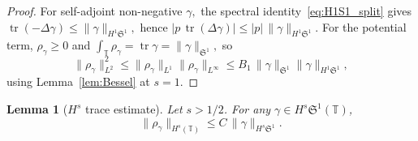 \documentclass[11pt]{amsart}
\newtheorem{lemma}[theorem]{Lemma}
\theoremstyle{definition}
\newcommand{\T}{\mathbb{T}}
\newcommand{\Sp}{\mathfrak{S}}
\DeclareMathOperator{\tr}{tr}
\begin{document}
\begin{proof}
For self-adjoint non-negative $\gamma,$ the spectral identity~\eqref{eq:H1S1_split} gives $\tr(-\Delta\gamma)\le\|\gamma\|_{H^1\Sp^1},$ hence $|p\,\tr(\Delta\gamma)|\le|p|\,\|\gamma\|_{H^1\Sp^1}.$ For the potential term, $\rho_\gamma\ge 0$ and $\int_\T\rho_\gamma=\tr\gamma=\|\gamma\|_{\Sp^1},$ so
\[
  \|\rho_\gamma\|_{L^2}^2
  \le\|\rho_\gamma\|_{L^1}\|\rho_\gamma\|_{L^\infty}
  \le B_1\,\|\gamma\|_{\Sp^1}\|\gamma\|_{H^1\Sp^1},
\]
using Lemma~\ref{lem:Bessel} at $s=1.$
\end{proof}

\begin{lemma}[$H^s$ trace estimate]\label{lem:trace}
Let $s>1/2$. For any $\gamma\in H^s\Sp^1(\T)$,
\begin{equation}\label{eq:trace_Hs}
  \|\rho_\gamma\|_{H^s(\T)}
  \le C\,\|\gamma\|_{H^s\Sp^1}.
\end{equation}
\end{lemma}
\end{document}

